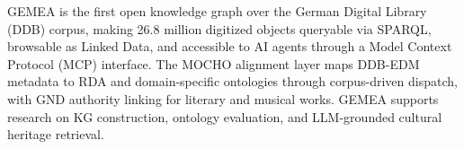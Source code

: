 GEMEA is the first open knowledge graph over the German Digital Library (DDB) corpus, making 26.8 million digitized objects queryable via SPARQL, browsable as Linked Data, and accessible to AI agents through a Model Context Protocol (MCP) interface.
The MOCHO alignment layer maps DDB-EDM metadata to RDA and domain-specific ontologies through corpus-driven dispatch, with GND authority linking for literary and musical works.
GEMEA supports research on KG construction, ontology evaluation, and LLM-grounded cultural heritage retrieval.
